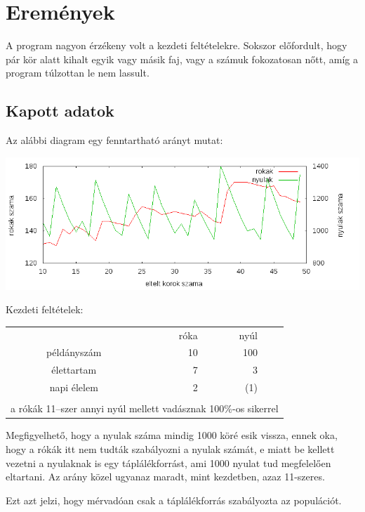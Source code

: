 \documentclass[twoside]{article}
\begin{document}
	\section*{Eremények}
		\par A program nagyon érzékeny volt a kezdeti feltételekre. Sokszor előfordult, hogy pár kör alatt kihalt egyik vagy másik faj, vagy a számuk fokozatosan nőtt, amíg a program túlzottan le nem lassult.
		\subsection*{Kapott adatok}	
		\par Az alábbi diagram egy fenntartható arányt mutat:
		\begin{center}
			\includegraphics[width = \textwidth]{../build/eredmenyek.png}
		\end{center}
		\par Kezdeti feltételek:
		\begin{center}
			\begin{tabular}{crrc}
				&róka&nyúl&\\
				példányszám&10&100&\\
				élettartam&7&3&\\
				napi élelem&2&(1)&\\
				&&&\\
				\multicolumn{4}{l}{a rókák 11--szer annyi nyúl mellett vadásznak 100\%-os sikerrel}\\
			\end{tabular}
		\end{center}
		\par Megfigyelhető, hogy a nyulak száma mindig 1000 köré esik vissza, ennek oka, hogy a rókák itt nem tudták szabályozni a nyulak számát, e miatt be kellett vezetni a nyulaknak is egy táplálékforrást, ami 1000 nyulat tud megfelelően eltartani. Az arány közel ugyanaz maradt, mint kezdetben, azaz 11-szeres.
		\par Ezt azt jelzi, hogy mérvadóan csak a táplálékforrás szabályozta az populációt.
\end{document}
